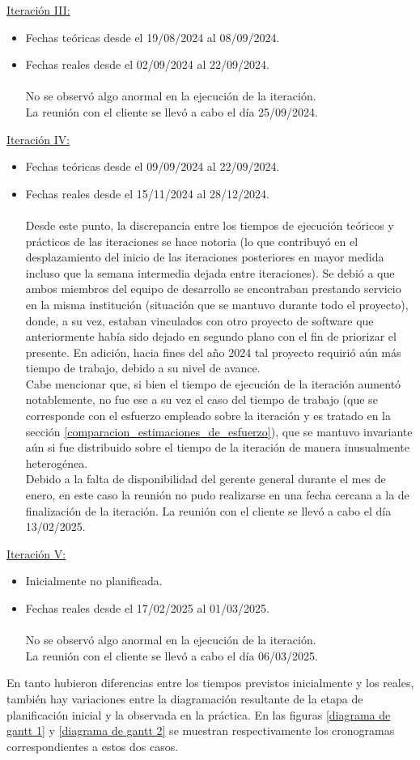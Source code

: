 \documentclass[a4paper, 12pt,twoside]{report}  %
\numberwithin{equation}{subsection} %
\begin{document}
\underline{Iteración III:}
\begin{itemize}
	\item Fechas teóricas desde el 19/08/2024 al 08/09/2024.
	\item Fechas reales desde el 02/09/2024 al 22/09/2024.\\\\
	No se observó algo anormal en la ejecución de la iteración.\\
	La reunión con el cliente se llevó a cabo el día 25/09/2024.
\end{itemize}
\underline{Iteración IV:}
\begin{itemize}
	\item Fechas teóricas desde el 09/09/2024 al 22/09/2024.
	\item Fechas reales desde el 15/11/2024 al 28/12/2024.\\\\
	Desde este punto, la discrepancia entre los tiempos de ejecución teóricos y prácticos de las iteraciones se hace notoria (lo que contribuyó en el desplazamiento del inicio de las iteraciones posteriores en mayor medida incluso que la semana intermedia dejada entre iteraciones). Se debió a que ambos miembros del equipo de desarrollo se encontraban prestando servicio en la misma institución (situación que se mantuvo durante todo el proyecto), donde, a su vez, estaban vinculados con otro proyecto de software que anteriormente había sido dejado en segundo plano con el fin de priorizar el presente. En adición, hacia fines del año 2024 tal proyecto requirió aún más tiempo de trabajo, debido a su nivel de avance.\\
	Cabe mencionar que, si bien el tiempo de ejecución de la iteración aumentó notablemente, no fue ese a su vez el caso del tiempo de trabajo (que se corresponde con el esfuerzo empleado sobre la iteración y es tratado en la sección \ref{comparacion_estimaciones_de_esfuerzo}), que se mantuvo invariante aún si fue distribuido sobre el tiempo de la iteración de manera inusualmente heterogénea.\\
	Debido a la falta de disponibilidad del gerente general durante el mes de enero, en este caso la reunión no pudo realizarse en una fecha cercana a la de finalización de la iteración. La reunión con el cliente se llevó a cabo el día 13/02/2025.
\end{itemize}
\underline{Iteración V:}
\begin{itemize}
	\item Inicialmente no planificada.
	\item Fechas reales desde el 17/02/2025 al 01/03/2025.\\\\
	No se observó algo anormal en la ejecución de la iteración.\\
	La reunión con el cliente se llevó a cabo el día 06/03/2025.
\end{itemize}
\indent En tanto hubieron diferencias entre los tiempos previstos inicialmente y los reales, también hay variaciones entre la diagramación resultante de la etapa de planificación inicial y la observada en la práctica. En las figuras \ref{diagrama de gantt 1} y \ref{diagrama de gantt 2} se muestran respectivamente los cronogramas correspondientes a estos dos casos.
\end{document}

